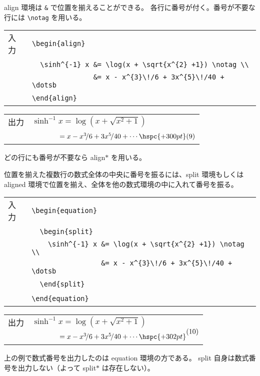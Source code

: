 align 環境は \verb`&` で位置を揃えることができる。
各行に番号が付く。番号が不要な行には \verb`\notag` を用いる。
\begin{longtable}[l]{@{}l|l@{}}
  入力 & \verb`\begin{align}`                                          \\
  \    & \verb`  \sinh^{-1} x &= \log(x + \sqrt{x^{2} +1}) \notag \\`  \\
  \    & \verb`               &= x - x^{3}\!/6 + 3x^{5}\!/40 + \dotsb` \\
  \    & \verb`\end{align}`                                            \\
\end{longtable}
\begin{longtable}[l]{@{}l|l@{}}
  出力 & $\sinh^{-1} x      = \log(x + \sqrt{x^{2} +1})$               \\
  \    & $\hphantom{\sinh^{-1} x} = x - x^{3}\!/6 + 3x^{5}\!/40 + \dotsb \hspc{+300pt} \text{(9)}$ \\
\end{longtable}
どの行にも番号が不要なら align$*$ を用いる。\\ \enlargethispage{+0.50zw}

位置を揃えた複数行の数式全体の中央に番号を振るには、split 環境もしくは aligned 環境で位置を揃え、全体を他の数式環境の中に入れて番号を振る。
\begin{longtable}[l]{@{}l|l@{}}
  入力 & \verb`\begin{equation}`                                         \\
  \    & \verb`  \begin{split}`                                          \\
  \    & \verb`    \sinh^{-1} x &= \log(x + \sqrt{x^{2} +1}) \notag \\`  \\
  \    & \verb`                 &= x - x^{3}\!/6 + 3x^{5}\!/40 + \dotsb` \\
  \    & \verb`  \end{split}`                                            \\
  \    & \verb`\end{equation}`                                           \\
\end{longtable}
\begin{longtable}[l]{@{}l|l@{}}
  出力 & $\sinh^{-1} x      = \log(x + \sqrt{x^{2} +1})$                 \\
  \    & $\hphantom{\sinh^{-1} x} = x - x^{3}\!/6 + 3x^{5}\!/40 + \dotsb \hspc{+302pt} \raisebox{+7.00pt}[0.00pt][0.00pt]{\text{(10)}}$ \\
\end{longtable}
上の例で数式番号を出力したのは equation 環境の方である。
split 自身は数式番号を出力しない（よって split$*$ は存在しない）。\\

